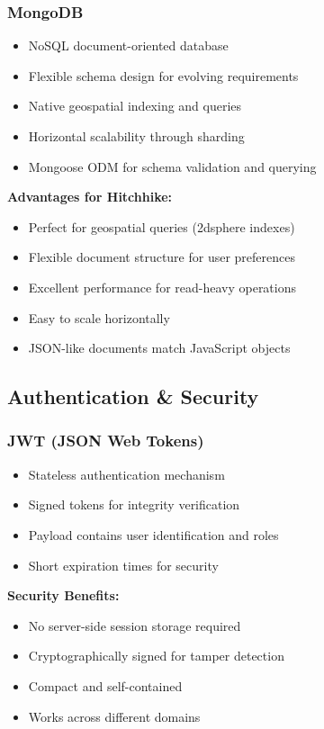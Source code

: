 \documentclass[12pt,a4paper]{article}
\begin{document}
\subsubsection{MongoDB}
\begin{itemize}
    \item NoSQL document-oriented database
    \item Flexible schema design for evolving requirements
    \item Native geospatial indexing and queries
    \item Horizontal scalability through sharding
    \item Mongoose ODM for schema validation and querying
\end{itemize}

\textbf{Advantages for Hitchhike:}
\begin{itemize}
    \item Perfect for geospatial queries (2dsphere indexes)
    \item Flexible document structure for user preferences
    \item Excellent performance for read-heavy operations
    \item Easy to scale horizontally
    \item JSON-like documents match JavaScript objects
\end{itemize}

\subsection{Authentication \& Security}

\subsubsection{JWT (JSON Web Tokens)}
\begin{itemize}
    \item Stateless authentication mechanism
    \item Signed tokens for integrity verification
    \item Payload contains user identification and roles
    \item Short expiration times for security
\end{itemize}

\textbf{Security Benefits:}
\begin{itemize}
    \item No server-side session storage required
    \item Cryptographically signed for tamper detection
    \item Compact and self-contained
    \item Works across different domains
\end{itemize}
\end{document}
